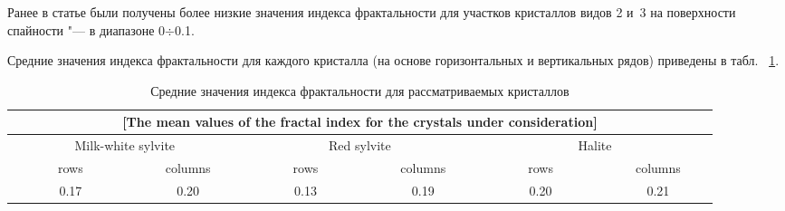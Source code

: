 Ранее в статье \cite{l1} были получены более низкие значения индекса фрактальности для участков кристаллов видов 2 и~3 на поверхности спайности "--- в диапазоне 0${\div}$0.1.



Средние значения индекса фрактальности для каждого кристалла (на основе горизонтальных и вертикальных рядов) приведены в табл. ~\ref{un:tabl01}.



\begin{table}[h!]



\small \centering



\caption{Средние значения индекса фрактальности для рассматриваемых кристаллов \label{un:tabl01}}

\vspace{-3mm}

\renewcommand{\tabcolsep}{0.08cm}

\begin{tabular}{|c|c|c|c|c|c|}

\multicolumn{6}{c}{[The mean values of the fractal index for the crystals under consideration] }\\

\hline


\multicolumn{2}{|c|}{\footnotesize  Milk-white sylvite} & 

\multicolumn{2}{c|}{\footnotesize  Red sylvite} & 

\multicolumn{2}{c|}{\footnotesize  Halite} \\

\hline

\footnotesize  ~~~~~~~rows~~~~~~~ & \footnotesize  ~~~~columns~~~~ & 

\footnotesize  ~~~~~~~rows~~~~~~~ & \footnotesize  ~~~~columns~~~~ & 

\footnotesize  ~~~~~~~rows~~~~~~~ & \footnotesize  ~~~~columns~~~~\\

\hline

\rule{0mm}{12pt}%


0.17 & 0.20 & 0.13 & 0.19 & 0.20 & 0.21

\\

            \hline

        \end{tabular}

\end{table} 



